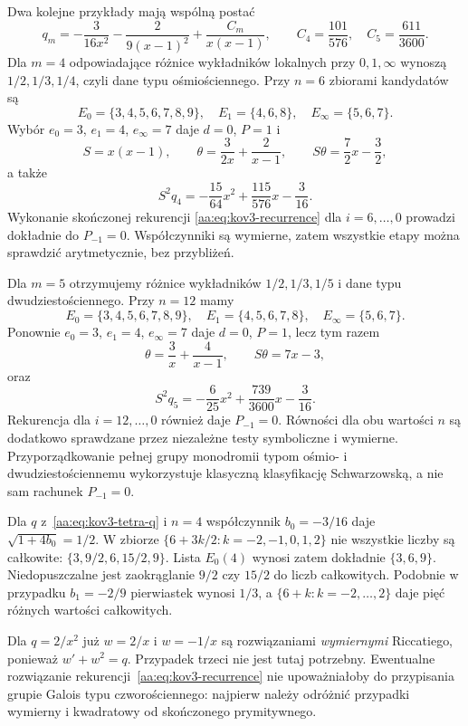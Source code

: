 \begin{przyklad}
\label{aa:prz:kov3-octa-icosa}
Dwa kolejne przykłady
mają wspólną postać
\[
 q_m=-\frac3{16x^2}
     -\frac2{9(x-1)^2}
     +\frac{C_m}{x(x-1)},\qquad
 C_4=\frac{101}{576},\quad
 C_5=\frac{611}{3600}.
\]
Dla $m=4$ odpowiadające
różnice wykładników lokalnych
przy $0,1,\infty$ wynoszą
$1/2,1/3,1/4$, czyli
dane typu ośmiościennego.
Przy $n=6$ zbiorami
kandydatów są
\[
 E_0=\{3,4,5,6,7,8,9\},
 \quad E_1=\{4,6,8\},
 \quad E_\infty=\{5,6,7\}.
\]
Wybór $e_0=3$, $e_1=4$,
$e_\infty=7$ daje $d=0$,
$P=1$ i
\[
 S=x(x-1),\qquad
 \theta=\frac3{2x}+\frac2{x-1},
 \qquad S\theta=\frac72x-\frac32,
\]
a także
\[
 S^2q_4
 =-\frac{15}{64}x^2
  +\frac{115}{576}x-\frac3{16}.
\]
Wykonanie skończonej
rekurencji
\eqref{aa:eq:kov3-recurrence}
dla $i=6,\ldots,0$
prowadzi dokładnie
do $P_{-1}=0$.
Współczynniki są wymierne,
zatem wszystkie etapy można
sprawdzić arytmetycznie,
bez przybliżeń.

Dla $m=5$ otrzymujemy
różnice wykładników
$1/2,1/3,1/5$ i dane
typu dwudziestościennego.
Przy $n=12$ mamy
\[
 E_0=\{3,4,5,6,7,8,9\},
 \quad E_1=\{4,5,6,7,8\},
 \quad E_\infty=\{5,6,7\}.
\]
Ponownie $e_0=3$, $e_1=4$,
$e_\infty=7$ daje $d=0$,
$P=1$, lecz tym razem
\[
 \theta=\frac3x+\frac4{x-1},
 \qquad S\theta=7x-3,
\]
oraz
\[
 S^2q_5
 =-\frac6{25}x^2
  +\frac{739}{3600}x-\frac3{16}.
\]
Rekurencja dla
$i=12,\ldots,0$ również
daje $P_{-1}=0$.
Równości dla obu wartości
$n$ są dodatkowo sprawdzane
przez niezależne testy
symboliczne i wymierne.
Przyporządkowanie
pełnej grupy monodromii
typom ośmio- i
dwudziestościennemu
wykorzystuje klasyczną
klasyfikację Schwarzowską,
a nie sam rachunek
$P_{-1}=0$.
\end{przyklad}

\begin{przyklad}
\label{aa:prz:kov3-integer-sets}
Dla $q$ z~\eqref{aa:eq:kov3-tetra-q}
i $n=4$ współczynnik
$b_0=-3/16$ daje
$\sqrt{1+4b_0}=1/2$.
W zbiorze
$\{6+3k/2:k=-2,-1,0,1,2\}$
nie wszystkie liczby są
całkowite:
$\{3,9/2,6,15/2,9\}$.
Lista $E_0(4)$ wynosi
zatem dokładnie $\{3,6,9\}$.
Niedopuszczalne jest
zaokrąglanie $9/2$ czy
$15/2$ do liczb całkowitych.
Podobnie w przypadku
$b_1=-2/9$ pierwiastek
wynosi $1/3$, a
$\{6+k:k=-2,\ldots,2\}$
daje pięć różnych
wartości całkowitych.
\end{przyklad}

\begin{przyklad}
\label{aa:prz:kov3-rational-degenerate}
Dla $q=2/x^2$ już
$w=2/x$ i $w=-1/x$
są rozwiązaniami
\emph{wymiernymi}
Riccatiego, ponieważ
$w'+w^2=q$.
Przypadek trzeci
nie jest tutaj potrzebny.
Ewentualne rozwiązanie
rekurencji~\eqref{aa:eq:kov3-recurrence}
nie upoważniałoby do
przypisania grupie Galois
typu czworościennego:
najpierw należy odróżnić
przypadki wymierny
i kwadratowy od skończonego
prymitywnego.
\end{przyklad}

